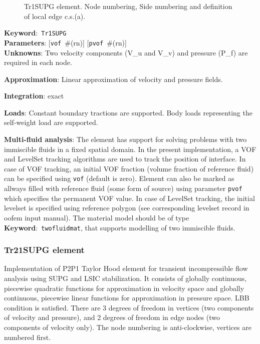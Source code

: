 \documentclass[a4paper]{article}
\newcommand{\descitem}[1]{{\noindent \textbf{#1}}:}
\newcommand{\elemkeyword}[1]{\descitem{Keyword}~\param{#1}} %
\newcommand{\param}[1]{\texttt{#1}} %
\newcommand{\optional}[1]{[#1]} %
\newcommand{\field}[2]{\param{#1}~\#{\tiny(#2)}} %
\newcommand{\optField}[2]{\optional{\field{#1}{#2}}}
\begin{document}
\begin{figure}[htb]
 \centering
 \begin{makeimage}
  
 \end{makeimage}
 \caption{Tr1SUPG element. Node numbering, Side numbering and
 definition of local edge c.s.(a).}
 \label{Tr1SUPG2fig}
\end{figure}

\elemkeyword{Tr1SUPG}\\
\descitem{Parameters} \optField{vof}{rn}
\optField{pvof}{rn}\\
\descitem{Unknowns}
Two velocity components (V\_u and V\_v) and pressure (P\_f) are required in each node.

\descitem{Approximation} Linear approximation of velocity and pressure
fields.

\descitem{Integration}
exact

\descitem{Loads} Constant boundary tractions are supported. Body loads
representing the self-weight load are supported.

\descitem{Multi-fluid analysis} The element has support for solving
problems with two immiscible fluids in
a fixed spatial domain. In the present implementation, a VOF and LevelSet tracking algorithms
are used to track the position of interface. In case of VOF tracking, an initial VOF fraction
(volume fraction of reference fluid) can be specified using
\param{vof} (default is zero). Element can also be marked as allways
filled with reference fluid (some form of source) using parameter
\param{pvof} which specifies the permanent VOF value. In case of LevelSet tracking, the initial levelset is specified using 
reference polygon (see corresponding levelset record in oofem input manual).
The material model should be of type \elemkeyword{twofluidmat}, that
supports modelling of two immiscible fluids.

\subsubsection{Tr21SUPG element}
\label{Tr21SUPG}
Implementation of P2P1 Taylor Hood element for transient incompressible flow analysis 
using SUPG and LSIC stabilization. It consists of globally continuous, piecewise quadratic functions for 
approximation in velocity space and globally continuous, piecewise linear functions for
approximation in pressure space. LBB condition is satisfied. There are 3 degrees
of freedom in vertices (two components of velocity and pressure), and 2 degrees of freedom
in edge nodes (two components of velocity only).
The node numbering is anti-clockwise, vertices are numbered first.
\end{document}
